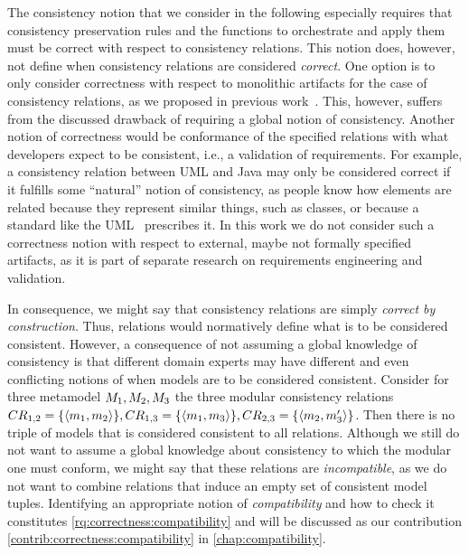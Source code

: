 The consistency notion that we consider in the following especially requires that consistency preservation rules and the functions to orchestrate and apply them must be correct with respect to consistency relations.
This notion does, however, not define when consistency relations are considered \emph{correct}.
One option is to only consider correctness with respect to monolithic artifacts for the case of consistency relations, as we proposed in previous work~.
This, however, suffers from the discussed drawback of requiring a global notion of consistency.
Another notion of correctness would be conformance of the specified relations with what developers expect to be consistent, i.e., a validation of requirements.
For example, a consistency relation between UML and Java may only be considered correct if it fulfills some \enquote{natural} notion of consistency, as people know how elements are related because they represent similar things, such as classes, or because a standard like the \gls{UML}~\cite{uml} prescribes it.
In this work we do not consider such a correctness notion with respect to external, maybe not formally specified artifacts, as it is part of separate research on requirements engineering and validation.

In consequence, we might say that consistency relations are simply \emph{correct by construction}.
Thus, relations would normatively define what is to be considered consistent.
However, a consequence of not assuming a global knowledge of consistency is that different domain experts may have different and even conflicting notions of when models are to be considered consistent.
Consider for three metamodel $\metamodel{M}{1}, \metamodel{M}{2}, \metamodel{M}{3}$ the three modular consistency relations $\consistencyrelation{CR}{1,2} = \setted{\tupled{\model{m}{1},\model{m}{2}}}, \consistencyrelation{CR}{1,3} = \setted{\tupled{\model{m}{1},\model{m}{3}}}, \consistencyrelation{CR}{2,3} = \setted{\tupled{\model{m}{2},\model{m}{3}'}}$. 
Then there is no triple of models that is considered consistent to all relations. 
Although we still do not want to assume a global knowledge about consistency to which the modular one must conform, we might say that these relations are \emph{incompatible}, as we do not want to combine relations that induce an empty set of consistent model tuples.
Identifying an appropriate notion of \emph{compatibility} and how to check it constitutes \autoref{rq:correctness:compatibility} and will be discussed as our contribution \autoref{contrib:correctness:compatibility} in \autoref{chap:compatibility}.

